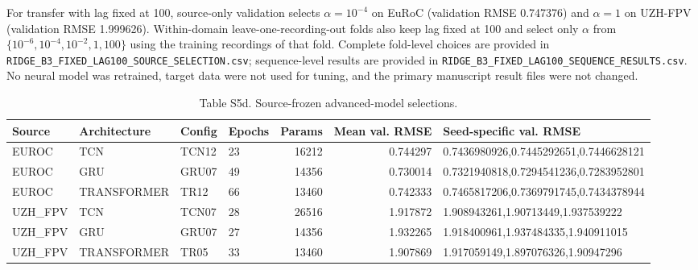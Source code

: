 \documentclass[11pt]{article}
\begin{document}
\begin{table}[htbp]\centering
\caption*{Table S5c. Selected-horizon equal-sequence RMSE for the fixed-100-lag B3 sensitivity, in m/s$^2$. The primary column is the source-selected-lag B3 Ridge used in the manuscript.}
\small
{}
\end{table}

\noindent For transfer with lag fixed at 100, source-only validation selects $\alpha=10^{-4}$ on EuRoC (validation RMSE 0.747376) and $\alpha=1$ on UZH-FPV (validation RMSE 1.999626). Within-domain leave-one-recording-out folds also keep lag fixed at 100 and select only $\alpha$ from $\{10^{-6},10^{-4},10^{-2},1,100\}$ using the training recordings of that fold. Complete fold-level choices are provided in \texttt{RIDGE\_B3\_FIXED\_LAG100\_SOURCE\_SELECTION.csv}; sequence-level results are provided in \texttt{RIDGE\_B3\_FIXED\_LAG100\_SEQUENCE\_RESULTS.csv}. No neural model was retrained, target data were not used for tuning, and the primary manuscript result files were not changed.

\begin{table}[htbp]\centering
\caption*{Table S5d. Source-frozen advanced-model selections.}


\scriptsize
\begin{tabular}{llllrrp{}}
\toprule
Source & Architecture & Config & Epochs & Params & Mean val. RMSE & Seed-specific val. RMSE\\
\midrule
EUROC & TCN & TCN12 & 23 & 16212 & 0.744297 & 0.7436980926,0.7445292651,0.7446628121 \\
EUROC & GRU & GRU07 & 49 & 14356 & 0.730014 & 0.7321940818,0.7294541236,0.7283952801 \\
EUROC & TRANSFORMER & TR12 & 66 & 13460 & 0.742333 & 0.7465817206,0.7369791745,0.7434378944 \\
UZH\_FPV & TCN & TCN07 & 28 & 26516 & 1.917872 & 1.908943261,1.90713449,1.937539222 \\
UZH\_FPV & GRU & GRU07 & 27 & 14356 & 1.932265 & 1.918400961,1.937484335,1.940911015 \\
UZH\_FPV & TRANSFORMER & TR05 & 33 & 13460 & 1.907869 & 1.917059149,1.897076326,1.90947296 \\
\bottomrule
\end{tabular}
\end{table}
\end{document}

